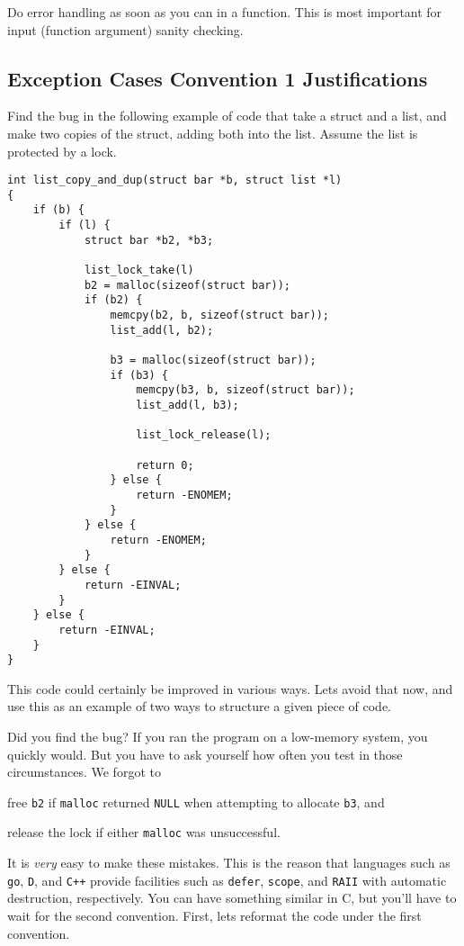 \documentclass[11pt,onecolumn]{article}
\newcommand{\head}[1]{\vspace{0.4em}\noindent{\bf #1}}
\begin{document}
\head{Convention 3.} Do error handling as soon as you can in a
function.  This is most important for input (function argument) sanity
checking.

\subsection{Exception Cases Convention 1 Justifications}

Find the bug in the following example of code that take a struct and a
list, and make two copies of the struct, adding both into the list.
Assume the list is protected by a lock.

    \begin{minipage}{3in}
      \footnotesize
      \lstset{language=C}
      \begin{lstlisting}
int list_copy_and_dup(struct bar *b, struct list *l)
{
    if (b) {
        if (l) {
            struct bar *b2, *b3;

            list_lock_take(l)
            b2 = malloc(sizeof(struct bar));
            if (b2) {
                memcpy(b2, b, sizeof(struct bar));
                list_add(l, b2);

                b3 = malloc(sizeof(struct bar));
                if (b3) {
                    memcpy(b3, b, sizeof(struct bar));
                    list_add(l, b3);

                    list_lock_release(l);

                    return 0;
                } else {
                    return -ENOMEM;
                }
            } else {
                return -ENOMEM;
            }
        } else {
            return -EINVAL;
        }
    } else {
        return -EINVAL;
    }
}
      \end{lstlisting}
    \end{minipage}

This code could certainly be improved in various ways.  Lets avoid
that now, and use this as an example of two ways to structure a given
piece of code.

Did you find the bug?  If you ran the program on a low-memory system,
you quickly would.  But you have to ask yourself how often you test in
those circumstances.  We forgot to
\begin{inparaenum}[(i)]
\item free {\tt b2} if {\tt malloc} returned {\tt NULL} when attempting
to allocate {\tt b3}, and
\item release the lock if either {\tt malloc} was unsuccessful.
\end{inparaenum}
It is {\em very} easy to make these mistakes.  This is the reason that
languages such as {\tt go}, {\tt D}, and {\tt C++} provide facilities
such as {\tt defer}, {\tt scope}, and {\tt RAII} with automatic
destruction, respectively.  You can have something similar in C, but
you'll have to wait for the second convention.  First, lets reformat
the code under the first convention.
\end{document}
